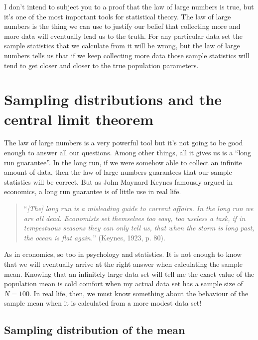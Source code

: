 \documentclass[
  a4paper,
]{book}
\begin{document}
I don't intend to subject you to a proof that the law of large numbers
is true, but it's one of the most important tools for statistical
theory. The law of large numbers is the thing we can use to justify our
belief that collecting more and more data will eventually lead us to the
truth. For any particular data set the sample statistics that we
calculate from it will be wrong, but the law of large numbers tells us
that if we keep collecting more data those sample statistics will tend
to get closer and closer to the true population parameters.

\hypertarget{sampling-distributions-and-the-central-limit-theorem}{%
\section{Sampling distributions and the central limit
theorem}\label{sampling-distributions-and-the-central-limit-theorem}}

The law of large numbers is a very powerful tool but it's not going to
be good enough to answer all our questions. Among other things, all it
gives us is a ``long run guarantee''. In the long run, if we were
somehow able to collect an infinite amount of data, then the law of
large numbers guarantees that our sample statistics will be correct. But
as John Maynard Keynes famously argued in economics, a long run
guarantee is of little use in real life.

\begin{quote}
``\emph{{[}The{]} long run is a misleading guide to current affairs. In
the long run we are all dead. Economists set themselves too easy, too
useless a task, if in tempestuous seasons they can only tell us, that
when the storm is long past, the ocean is flat again.}'' (Keynes, 1923,
p. 80).
\end{quote}

As in economics, so too in psychology and statistics. It is not enough
to know that we will eventually arrive at the right answer when
calculating the sample mean. Knowing that an infinitely large data set
will tell me the exact value of the population mean is cold comfort when
my actual data set has a sample size of \(N = 100\). In real life, then,
we must know something about the behaviour of the sample mean when it is
calculated from a more modest data set!

\hypertarget{sec-Sampling-distribution-of-the-mean}{%
\subsection{Sampling distribution of the
mean}\label{sec-Sampling-distribution-of-the-mean}}
\end{document}
